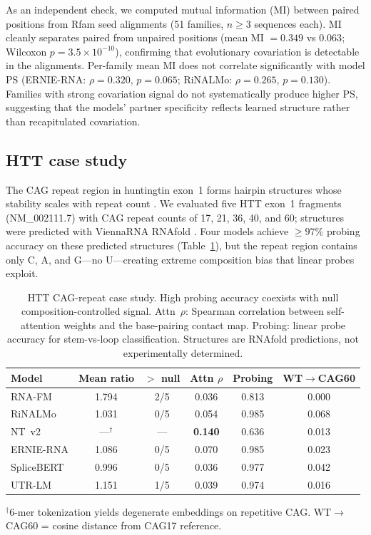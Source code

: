 \documentclass[11pt]{article}
\begin{document}
As an independent check, we computed mutual information (MI) between
paired positions from Rfam seed alignments (51 families, $n \geq 3$
sequences each). MI cleanly separates paired from unpaired positions
(mean MI $= 0.349$ vs $0.063$; Wilcoxon $p = 3.5 \times 10^{-10}$),
confirming that evolutionary covariation is detectable in the
alignments. Per-family mean MI does not correlate significantly with
model PS (ERNIE-RNA: $\rho = 0.320$, $p = 0.065$; RiNALMo:
$\rho = 0.265$, $p = 0.130$). Families with strong covariation signal
do not systematically produce higher PS, suggesting that the models'
partner specificity reflects learned structure rather than
recapitulated covariation.


\subsection{HTT case study}
\label{sec:htt-results}

The CAG repeat region in huntingtin exon~1 forms hairpin structures whose
stability scales with repeat count \citep{demezer2011mutant,
krzyzosiak2012triplet}. We evaluated five HTT exon~1 fragments
(NM\_002111.7) with CAG repeat counts of 17, 21, 36, 40, and 60;
structures were predicted with ViennaRNA RNAfold
\citep{lorenz2011viennarna}. Four models achieve $\geq 97$\% probing
accuracy on these predicted structures (Table~\ref{tab:htt}), but the
repeat region contains only C, A, and G---no U---creating extreme
composition bias that linear probes exploit.

\begin{table}[htbp]
\centering
\caption{HTT CAG-repeat case study. High probing accuracy coexists with null
composition-controlled signal. Attn~$\rho$: Spearman correlation between
self-attention weights and the base-pairing contact map.
Probing: linear probe accuracy for stem-vs-loop classification.
Structures are RNAfold predictions, not experimentally determined.}
\label{tab:htt}
\begin{tabular}{@{}lccccc@{}}
\toprule
\textbf{Model} & \textbf{Mean ratio} & \textbf{$>$ null} &
  \textbf{Attn $\rho$} & \textbf{Probing} &
  \textbf{WT$\to$CAG60} \\
\midrule
RNA-FM     & 1.794 & 2/5  & 0.036 & 0.813 & 0.000 \\
RiNALMo    & 1.031 & 0/5  & 0.054 & 0.985 & 0.068 \\
NT~v2      & ---$^\dagger$ & ---   & \textbf{0.140} & 0.636 & 0.013 \\
ERNIE-RNA  & 1.086 & 0/5  & 0.070 & 0.985 & 0.023 \\
SpliceBERT & 0.996 & 0/5  & 0.036 & 0.977 & 0.042 \\
UTR-LM     & 1.151 & 1/5  & 0.039 & 0.974 & 0.016 \\
\bottomrule
\end{tabular}
\medskip

\small $^\dagger$6-mer tokenization yields degenerate embeddings on
repetitive CAG. WT$\to$CAG60 = cosine distance from CAG17 reference.
\end{table}
\end{document}
